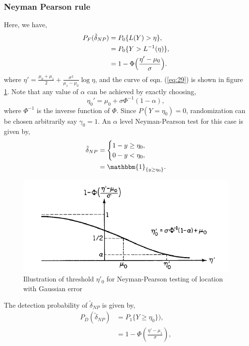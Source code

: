 \documentclass[a4paper,english,12pt]{article}
\begin{document}
\begin{exmp}
\subsubsection*{Neyman Pearson rule}
Here, we have,
\begin{align}
P_F(\tilde{\delta}_{NP})&=P_0\{L(Y)>\eta\},\nonumber\\
					  &=P_0\{Y>L^{-1}(\eta)\},\nonumber\\
					  &=1-\Phi\Bigl(\frac{\eta'-\mu_0}{\sigma}\Bigr).\label{eq:29}
\end{align}
 where $\eta'=\frac{\mu_{0}+\mu_{1}}{2}+\frac{\sigma^2}{\mu_1-\mu_0}\log\eta$, and the curve of eqn. (\ref{eq:29}) is shown in figure \ref{fig:neymanerror}. Note that any value of $\alpha$ can be achieved by exactly choosing,
\begin{equation}
\eta_0'=\mu_{0}+\sigma\Phi^{-1}(1-\alpha),
\end{equation}
where $\Phi^{-1}$ is the inverse function of $\Phi$. Since $P(Y=\eta_0)=0$, randomization can be chosen arbitrarily say $\gamma_0=1$. An $\alpha$ level Neyman-Pearson test for this case is given by,
\begin{align}
\tilde{\delta}_{NP}&=
				   \begin{cases}\nonumber 
				   1-y\geq\eta_0,\label{eq:46} \\
				   0-y<\eta_0,\\
				   \end{cases}\\
				&=\mathbbm{1}_{\{ y\geq\eta_0 \}}.
\end{align}
\begin{figure}[h]
\centering
\includegraphics[width=0.7\linewidth]{Figures/Gauss_Neyman}
\caption{Illustration of threshold $\eta'_{0}$ for Neyman-Pearson testing of location with Gaussian error}
\label{fig:neymanerror}
\end{figure}
The detection probability of $\tilde{\delta}_{NP}$ is given by,
\begin{align}
P_D(\tilde{\delta}_{NP})&=P_1\{Y\geq\eta_0\}),\nonumber\\
					  &=1-\Phi(\frac{\eta'-\mu_1}{\sigma}),\label{eq:49}\nonumber\\

\end{align}
\end{exmp}
\end{document}

